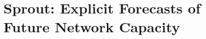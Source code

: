 \chapter{Sprout: Explicit Forecasts of Future Network Capacity}
\label{chap:sprout}

\begin{abstract}

\end{abstract}




%






